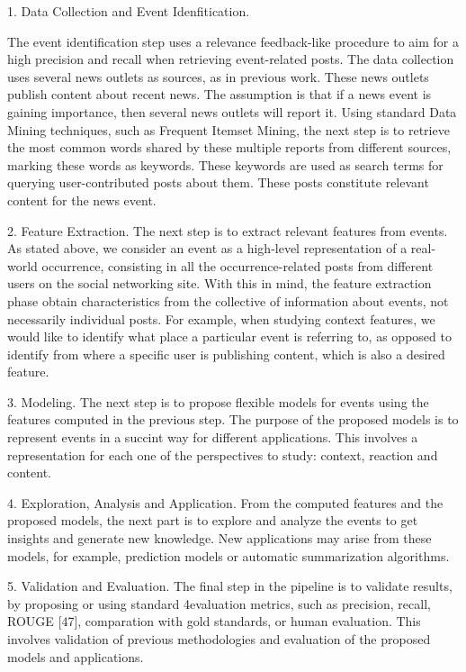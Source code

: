 \begin{intro}
1. Data Collection and Event Idenfitication. 


The event identification step uses a relevance feedback-like procedure to aim
for a high precision and recall when retrieving event-related posts. The data
collection uses several news outlets as sources, as in previous work. These news
outlets publish content about recent news. The assumption is that if a news
event is gaining importance, then several news outlets will report it. Using
standard Data Mining techniques, such as Frequent Itemset Mining, the next step
is to retrieve the most common words shared by these multiple reports from
different sources, marking these words as keywords. These keywords are used as
search terms for querying user-contributed posts about them. These posts
constitute relevant content for the news event. 

2. Feature Extraction. The next step is to extract relevant features from
events. As stated above, we consider an event as a high-level representation of
a real-world occurrence, consisting in all the occurrence-related posts from
different users on the social networking site. With this in mind, the feature
extraction phase obtain characteristics from the collective of information about
events, not necessarily individual posts. For example, when studying context
features, we would like to identify what place a particular event is referring
to, as opposed to identify from where a specific user is publishing content,
which is also a desired feature. 

3. Modeling. The next step is to propose flexible models for events using the
features computed in the previous step. The purpose of the proposed models is to
represent events in a succint way for different applications. This involves a
representation for each one of the perspectives to study: context, reaction and
content. 

4. Exploration, Analysis and Application. From the computed features and the
proposed models, the next part is to explore and analyze the events to get
insights and generate new knowledge. New applications may arise from these
models, for example, prediction models or automatic summarization algorithms. 

5. Validation and Evaluation. The final step in the pipeline is to validate
results, by proposing or using standard 4evaluation metrics, such as precision,
recall, ROUGE [47], comparation with gold standards, or human evaluation. This
involves validation of previous methodologies and evaluation of the proposed
models and applications.


\end{intro}